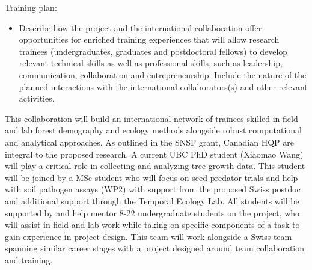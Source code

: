 \documentclass[12pt,oneside]{article}
\newenvironment{smitemize}{
\begin{itemize}
  \setlength{\itemsep}{1pt}
  \setlength{\parskip}{0pt}
  \setlength{\parsep}{0pt}}
{\end{itemize}
}
\begin{document}
{\sc Training plan:}  %
\vspace{-1ex}
\begin{smitemize}
\item  Describe how the project and the international collaboration offer opportunities for enriched training experiences that will allow research trainees (undergraduates, graduates and postdoctoral fellows) to develop relevant technical skills as well as professional skills, such as leadership, communication, collaboration and entrepreneurship. Include the nature of the planned interactions with the international collaborators(s) and other relevant activities.
\end{smitemize}
This collaboration will build an international network of trainees skilled in field and lab forest demography and ecology methods alongside robust computational and analytical approaches. As outlined in the SNSF grant, Canadian HQP are integral to the proposed research. A current UBC PhD student (Xiaomao Wang) will play a critical role in collecting and analyzing tree growth data. This student will be joined by a MSc student who will focus on seed predator trials and help with soil pathogen assays (WP2) with support from the proposed Swiss postdoc and additional support through the Temporal Ecology Lab. All students will be supported by and help mentor 8-22 undergraduate students on the project, who will assist in field and lab work while taking on specific components of a task to gain experience in project design. This team will work alongside a Swiss team spanning similar career stages with a project designed around team collaboration and training.
\end{document}
